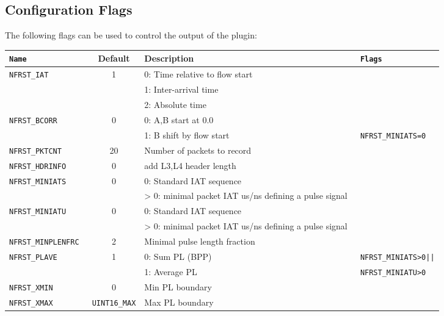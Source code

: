 \documentclass[documentation]{subfiles}
\begin{document}
\subsection{Configuration Flags}
The following flags can be used to control the output of the plugin:
\begin{longtable}{>{\tt}lcl>{\tt\small}l}
    \toprule
    {\bf Name} & {\bf Default} & {\bf Description} & {\bf Flags}\\
    \midrule\endhead%
    NFRST\_IAT        &  1 & 0: Time relative to flow start                        & \\
                      &    & 1: Inter-arrival time                                 & \\
                      &    & 2: Absolute time                                      & \\
    NFRST\_BCORR      &  0 & 0: A,B start at 0.0                                   & \\
                      &    & 1: B shift by flow start                              & NFRST\_MINIATS=0\\
    NFRST\_PKTCNT     & 20 & Number of packets to record                           & \\
    NFRST\_HDRINFO    &  0 & add L3,L4 header length                               & \\
    NFRST\_MINIATS    &  0 & 0: Standard IAT sequence                              & \\
                      &    & > 0: minimal packet IAT us/ns defining a pulse signal & \\
    NFRST\_MINIATU    &  0 & 0: Standard IAT sequence                              & \\
                      &    & > 0: minimal packet IAT us/ns defining a pulse signal & \\
    NFRST\_MINPLENFRC &  2 & Minimal pulse length fraction                         & \\
    NFRST\_PLAVE      &  1 & 0: Sum PL (BPP)                                       & NFRST\_MINIATS>0||\\
                      &    & 1: Average PL                                         & NFRST\_MINIATU>0\\
    NFRST\_XMIN       &  0 & Min PL boundary                                       &\\
    NFRST\_XMAX       & {\tt\small UINT16\_MAX}
                           & Max PL boundary                                       & \\
    \bottomrule
\end{longtable}
\end{document}
